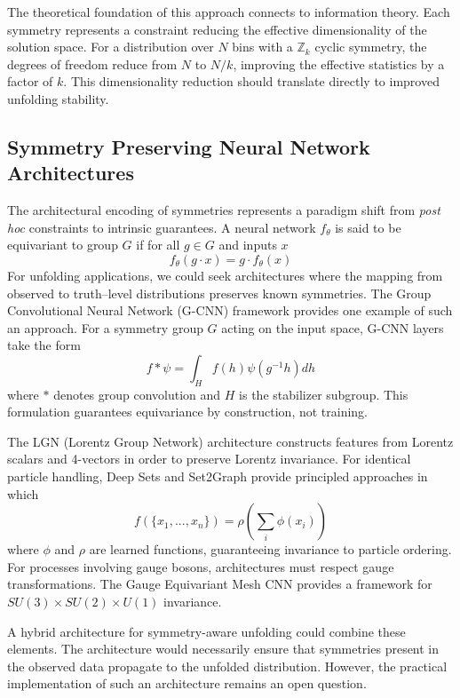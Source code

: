     The theoretical foundation of this approach connects to information theory.
    Each symmetry represents a constraint reducing the effective dimensionality of the solution space.
    For a distribution over \(N\) bins with a \(\mathbb{Z}_k\) cyclic symmetry, the degrees of freedom reduce from \(N\) to \(N/k\), improving the effective statistics by a factor of \(k\).
    This dimensionality reduction should translate directly to improved unfolding stability.

    \subsection{Symmetry Preserving Neural Network Architectures}
        The architectural encoding of symmetries represents a paradigm shift from \textit{post hoc} constraints to intrinsic guarantees.
        A neural network \(f_\theta\) is said to be equivariant to group \(G\) if for all \(g \in G\) and inputs \(x\)
        \[
            f_\theta(g \cdot x) = g \cdot f_\theta(x)
        \]
        For unfolding applications, we could seek architectures where the mapping from observed to truth--level distributions preserves known symmetries.
        The Group Convolutional Neural Network (G-CNN) framework provides one example of such an approach.
        For a symmetry group \(G\) acting on the input space, G-CNN layers take the form
        \[
            f * \psi = \int_H f(h)\psi(g^{-1}h) dh
        \]
        where \(*\) denotes group convolution and \(H\) is the stabilizer subgroup.
        This formulation guarantees equivariance by construction, not training.

        The LGN (Lorentz Group Network) architecture constructs features from Lorentz scalars and 4-vectors in order to preserve Lorentz invariance.
        For identical particle handling, Deep Sets and Set2Graph provide principled approaches in which
        \[
            f(\{x_1, ..., x_n\}) = \rho\left(\sum_i \phi(x_i)\right)
        \]
        where \(\phi\) and \(\rho\) are learned functions, guaranteeing invariance to particle ordering.
        For processes involving gauge bosons, architectures must respect gauge transformations.
        The Gauge Equivariant Mesh CNN provides a framework for \(SU(3) \times SU(2) \times U(1)\) invariance.

        A hybrid architecture for symmetry-aware unfolding could combine these elements.
        The architecture would necessarily ensure that symmetries present in the observed data propagate to the unfolded distribution.
        However, the practical implementation of such an architecture remains an open question.

